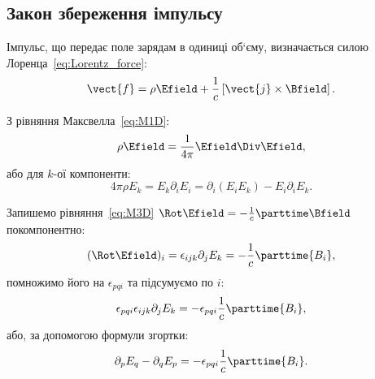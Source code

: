 \subsection*{Закон збереження імпульсу}

Імпульс, що передає поле зарядам в одиниці об`єму, визначається силою Лоренца~\eqref{eq:Lorentz_force}:
\begin{equation*}
	\vect{f} = \rho\Efield + \frac1c\left[\vect{j}\times\Bfield\right].
\end{equation*}

З рівняння Максвелла~\eqref{eq:M1D}:
\begin{equation*}
	\rho\Efield = \frac1{4\pi}\Efield\Div\Efield,
\end{equation*}
або для $k$-ої компоненти:
\begin{equation*}
	4\pi\rho E_k = E_k\partial_iE_i = \partial_i(E_iE_k) - E_i \partial_iE_k.
\end{equation*}

Запишемо рівняння~\eqref{eq:M3D} $\Rot\Efield = - \frac1c \parttime\Bfield$ покомпонентно:
\begin{equation*}
	(\Rot\Efield)_i = \epsilon_{ijk}\partial_j E_k = - \frac1c \parttime{B_i},
\end{equation*}
помножимо його на $\epsilon_{pqi}$ та підсумуємо по $i$:
\begin{equation*}
	\epsilon_{pqi}\epsilon_{ijk}\partial_j E_k = - \epsilon_{pqi}  \frac1c \parttime{B_i},
\end{equation*}
або, за допомогою формули згортки:
\begin{equation*}
	\partial_pE_q -  \partial_qE_p = - \epsilon_{pqi}  \frac1c \parttime{B_i}.
\end{equation*}

